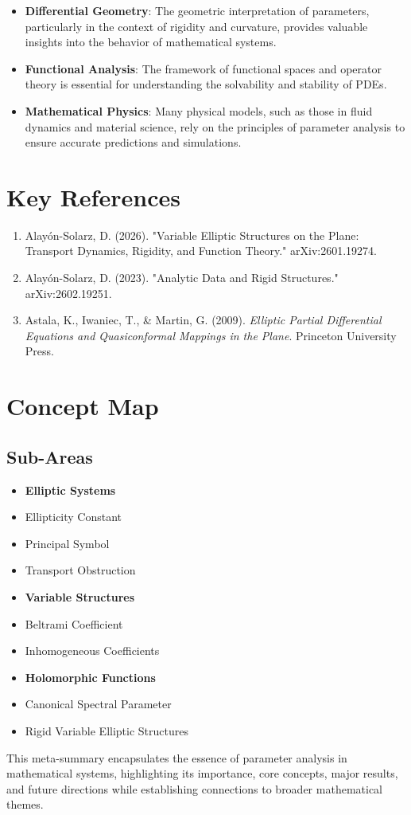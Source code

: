 \documentclass[11pt,a4paper]{article}
\begin{document}
\begin{itemize}
\item \textbf{Differential Geometry}: The geometric interpretation of parameters, particularly in the context of rigidity and curvature, provides valuable insights into the behavior of mathematical systems.
\end{itemize}

\begin{itemize}
\item \textbf{Functional Analysis}: The framework of functional spaces and operator theory is essential for understanding the solvability and stability of PDEs.
\end{itemize}

\begin{itemize}
\item \textbf{Mathematical Physics}: Many physical models, such as those in fluid dynamics and material science, rely on the principles of parameter analysis to ensure accurate predictions and simulations.
\end{itemize}

\section{Key References}
\begin{enumerate}
\item Alayón-Solarz, D. (2026). "Variable Elliptic Structures on the Plane: Transport Dynamics, Rigidity, and Function Theory." arXiv:2601.19274.
\item Alayón-Solarz, D. (2023). "Analytic Data and Rigid Structures." arXiv:2602.19251.
\item Astala, K., Iwaniec, T., & Martin, G. (2009). \textit{Elliptic Partial Differential Equations and Quasiconformal Mappings in the Plane}. Princeton University Press.
\end{enumerate}

\section{Concept Map}
\subsection{Sub-Areas}
\begin{itemize}
\item \textbf{Elliptic Systems}
\item Ellipticity Constant
\item Principal Symbol
\item Transport Obstruction
\item \textbf{Variable Structures}
\item Beltrami Coefficient
\item Inhomogeneous Coefficients
\item \textbf{Holomorphic Functions}
\item Canonical Spectral Parameter
\item Rigid Variable Elliptic Structures
\end{itemize}

This meta-summary encapsulates the essence of parameter analysis in mathematical systems, highlighting its importance, core concepts, major results, and future directions while establishing connections to broader mathematical themes.
\end{document}
